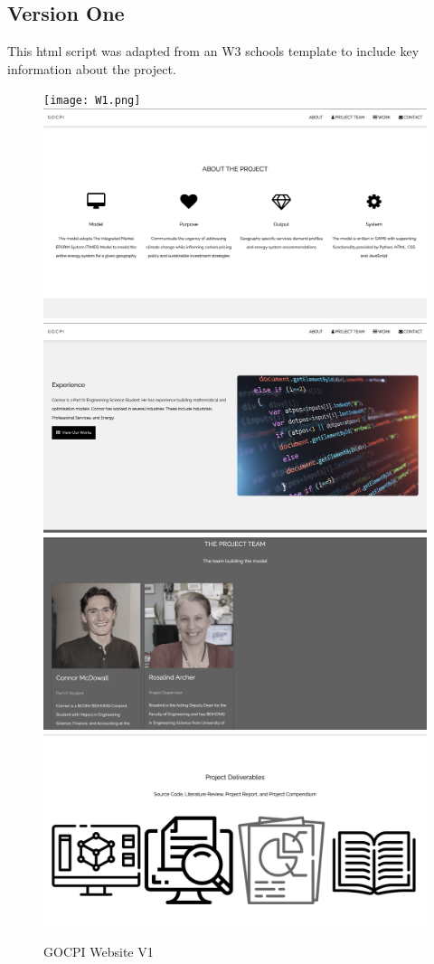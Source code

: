 \documentclass[12pt]{article}
\begin{document}
\subsection{Version One}
This html script was adapted from an W3 schools template to include key information about the project.
\begin{figure}[h]
    \centering
	\texttt{[image: W1.png]}
	\includegraphics[width=\textwidth]{W2.png}
	\includegraphics[width=\textwidth]{W3.png}
	\includegraphics[width=\textwidth]{W4.png}
	\includegraphics[width=\textwidth]{W5.png}
    \caption{GOCPI Website V1}
    \label{fig:WV1}
\end{figure}
\newpage
\end{document}
